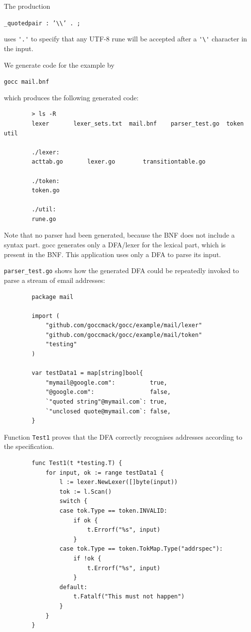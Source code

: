 \documentclass[12pt]{article}
\begin{document}
	The production

	\verb|_quotedpair : ’\\’ . ;|

	uses \verb|'.'| to specify that any UTF-8 rune will be accepted after a \verb|'\'| character in the input.

	We generate code for the example by

	\verb|gocc mail.bnf|

	which produces the following generated code:

	\begin{verbatim}
		> ls -R
		lexer		lexer_sets.txt	mail.bnf	parser_test.go	token		util

		./lexer:
		acttab.go		lexer.go		transitiontable.go

		./token:
		token.go

		./util:
		rune.go
	\end{verbatim}

	Note that no parser had been generated, because the BNF does not include a syntax part. gocc generates only a DFA/lexer for the lexical part, which is present in the BNF. This application uses only a DFA to parse its input.

	\verb|parser_test.go| shows how the generated DFA could be repeatedly invoked to parse a stream of email addresses:

	\begin{verbatim}
		package mail

		import (
		    "github.com/goccmack/gocc/example/mail/lexer"
		    "github.com/goccmack/gocc/example/mail/token"
		    "testing"
		)

		var testData1 = map[string]bool{
		    "mymail@google.com":          true,
		    "@google.com":                false,
		    `"quoted string"@mymail.com`: true,
		    `"unclosed quote@mymail.com`: false,
		}
	\end{verbatim}

	Function \verb|Test1| proves that the DFA correctly recognises addresses according to the specification.

	\begin{verbatim}
		func Test1(t *testing.T) {
		    for input, ok := range testData1 {
		        l := lexer.NewLexer([]byte(input))
		        tok := l.Scan()
		        switch {
		        case tok.Type == token.INVALID:
		            if ok {
		                t.Errorf("%s", input)
		            }
		        case tok.Type == token.TokMap.Type("addrspec"):
		            if !ok {
		                t.Errorf("%s", input)
		            }
		        default:
		            t.Fatalf("This must not happen")
		        }
		    }
		}

	\end{verbatim}
\end{document}
